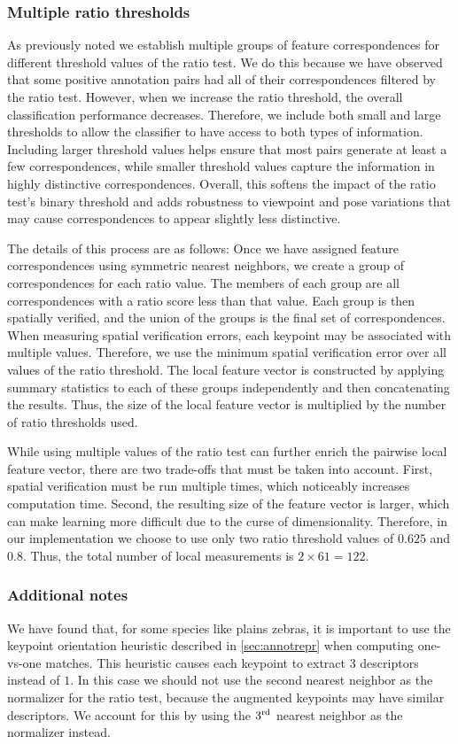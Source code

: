 \subsubsection{Multiple ratio thresholds}
As previously noted we establish multiple groups of feature correspondences for different threshold values of the
  ratio test.
We do this because we have observed that some positive annotation pairs had all of their correspondences filtered
  by the ratio test.
However, when we increase the ratio threshold, the overall classification performance decreases.
Therefore, we include both small and large thresholds to allow the classifier to have access to both types of
  information.
Including larger threshold values helps ensure that most pairs generate at least a few correspondences, while
  smaller threshold values capture the information in highly distinctive correspondences.
Overall, this softens the impact of the ratio test's binary threshold and adds robustness to viewpoint and pose
  variations that may cause correspondences to appear slightly less distinctive.

The details of this process are as follows:
Once we have assigned feature correspondences using symmetric nearest neighbors, we create a group of
  correspondences for each ratio value.
The members of each group are all correspondences with a ratio score less than that value.
Each group is then spatially verified, and the union of the groups is the final set of correspondences.
When measuring spatial verification errors, each keypoint may be associated with multiple values.
Therefore, we use the minimum spatial verification error over all values of the ratio threshold.
The local feature vector is constructed by applying summary statistics to each of these groups independently and
  then concatenating the results.
Thus, the size of the local feature vector is multiplied by the number of ratio thresholds used.

While using multiple values of the ratio test can further enrich the pairwise local feature vector, there are two
  trade-offs that must be taken into account.
First, spatial verification must be run multiple times, which noticeably increases computation time.
Second, the resulting size of the feature vector is larger, which can make learning more difficult due to the
  curse of dimensionality.
Therefore, in our implementation we choose to use only two ratio threshold values of $0.625$ and $0.8$.
Thus, the total number of local measurements is $2 \times 61 = 122$.

\subsubsection{Additional notes}
We have found that, for some species like plains zebras, it is important to use the keypoint orientation
  heuristic described in \cref{sec:annotrepr} when computing one-vs-one matches.
This heuristic causes each keypoint to extract $3$ descriptors instead of $1$.
In this case we should not use the second nearest neighbor as the normalizer for the ratio test, because the
  augmented keypoints may have similar descriptors.
We account for this by using the $3^{\textrm{rd}}{}$ nearest neighbor as the normalizer instead.

